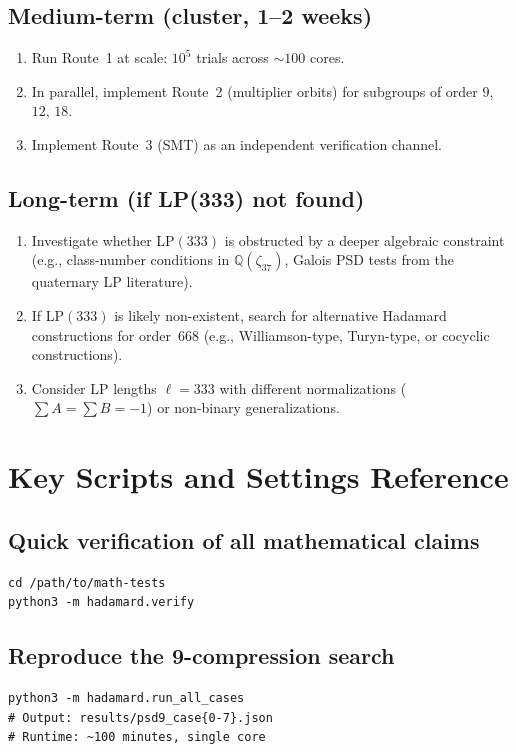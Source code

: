 \documentclass[11pt,a4paper]{article}
\newcommand{\Q}{\mathbb{Q}}
\theoremstyle{plain}
\theoremstyle{definition}
\theoremstyle{remark}
\begin{document}
\subsection{Medium-term (cluster, 1--2 weeks)}
\begin{enumerate}
\item Run Route~1 at scale: $10^5$ trials across $\sim100$ cores.
\item In parallel, implement Route~2 (multiplier orbits) for subgroups of order $9$, $12$, $18$.
\item Implement Route~3 (SMT) as an independent verification channel.
\end{enumerate}

\subsection{Long-term (if LP(333) not found)}
\begin{enumerate}
\item Investigate whether LP$(333)$ is obstructed by a deeper algebraic constraint (e.g., class-number conditions in $\Q(\zeta_{37})$, Galois PSD tests from the quaternary LP literature).
\item If LP$(333)$ is likely non-existent, search for alternative Hadamard constructions for order~$668$ (e.g., Williamson-type, Turyn-type, or cocyclic constructions).
\item Consider LP lengths $\ell=333$ with different normalizations ($\sum A=\sum B=-1$) or non-binary generalizations.
\end{enumerate}

\section{Key Scripts and Settings Reference}

\subsection{Quick verification of all mathematical claims}
\begin{lstlisting}
cd /path/to/math-tests
python3 -m hadamard.verify
\end{lstlisting}

\subsection{Reproduce the 9-compression search}
\begin{lstlisting}
python3 -m hadamard.run_all_cases
# Output: results/psd9_case{0-7}.json
# Runtime: ~100 minutes, single core
\end{lstlisting}
\end{document}
